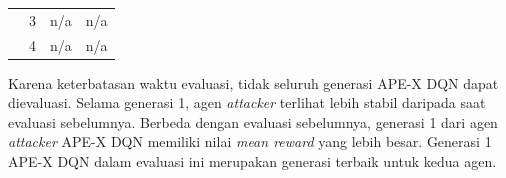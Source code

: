 \begin{table}[H]
\begin{tabular}{|c|c|c|c|}
    & 3                                                                            & n/a                                                                              & n/a                                                                              \\ \cline{2-4} 
    & 4                                                                            & n/a                                                                              & n/a                                                                              \\ \hline
  \end{tabular}
\end{table}

Karena keterbatasan waktu evaluasi, tidak seluruh generasi APE-X DQN dapat dievaluasi.
Selama generasi 1, agen \emph{attacker} terlihat lebih stabil daripada saat evaluasi sebelumnya.
Berbeda dengan evaluasi sebelumnya, generasi 1 dari agen \emph{attacker} APE-X DQN memiliki nilai \emph{mean reward} yang lebih besar.
Generasi 1 APE-X DQN dalam evaluasi ini merupakan generasi terbaik untuk kedua agen.


